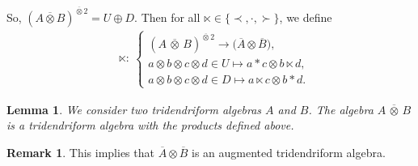 \documentclass[10pt,a4paper]{amsart}
\numberwithin{equation}{section}
\theoremstyle{definition}
\newtheorem{Rq}[defi]{Remark}
\theoremstyle{plain}
\newtheorem{Lemme}[defi]{Lemma}
\begin{document}
So, $(A\overline{\otimes} B)^{\overline{\otimes} 2}=U\oplus D$. Then for all $\ltimes \in\{\prec,\cdot,\succ\}$, we define
\begin{align*}
&\ltimes\colon \ \begin{cases}
 (A\,\overline{\otimes}\, B)^{\overline{\otimes} 2} \rightarrow \big(\overline{A}\otimes \overline{B}\big), \\
a\otimes b\otimes c\otimes d\in U \mapsto a*c\otimes b\ltimes d, \\
a\otimes b\otimes c\otimes d \in D \mapsto a\ltimes c \otimes b*d.
\end{cases}
\end{align*}


\begin{Lemme}
	We consider two tridendriform algebras $A$ and $B$. The algebra $A\,\overline{\otimes}\, B$ is a tridendriform algebra with the products defined above.
\end{Lemme}
\begin{Rq}
	This implies that $\overline{A}\otimes\overline{B}$ is an augmented tridendriform algebra.
\end{Rq}
\end{document}
